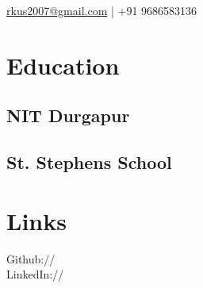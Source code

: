 \documentclass[]{kushal-resume}
\begin{document}
%
%

%
%

 {  
\href{mailto:rkus2007@gmail.com}{rkus2007@gmail.com} | +91 9686583136} \\

%
%

\begin{minipage}[t]{0.33\textwidth} 


\section{Education}

\subsection{NIT  Durgapur}
\sectionsep

\subsection{St. Stephens School}
\sectionsep


\section{Links}
Github:// \href{https://github.com/kushal-r}{} \\
LinkedIn://  \href{https://www.linkedin.com/in/roykushal/}{} \\
\sectionsep


\vspace{\topsep}

\end{minipage}
\end{document}

